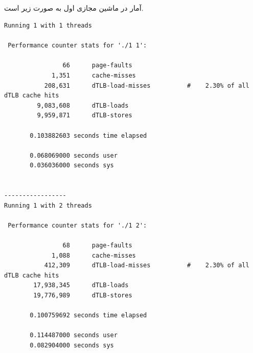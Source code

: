 \documentclass{article}
\begin{document}
\subsection{}
آمار در ماشین مجازی اول به صورت زیر است. 
\begin{latin}
\begin{lstlisting}
Running 1 with 1 threads

 Performance counter stats for './1 1':

                66      page-faults                                                 
             1,351      cache-misses                                                
           208,631      dTLB-load-misses          #    2.30% of all dTLB cache hits 
         9,083,608      dTLB-loads                                                  
         9,959,871      dTLB-stores                                                 

       0.103882603 seconds time elapsed

       0.068069000 seconds user
       0.036036000 seconds sys


-----------------
Running 1 with 2 threads

 Performance counter stats for './1 2':

                68      page-faults                                                 
             1,088      cache-misses                                                
           412,309      dTLB-load-misses          #    2.30% of all dTLB cache hits 
        17,938,345      dTLB-loads                                                  
        19,776,989      dTLB-stores                                                 

       0.100759692 seconds time elapsed

       0.114487000 seconds user
       0.082904000 seconds sys
\end{lstlisting}
\end{latin}
\end{document}
